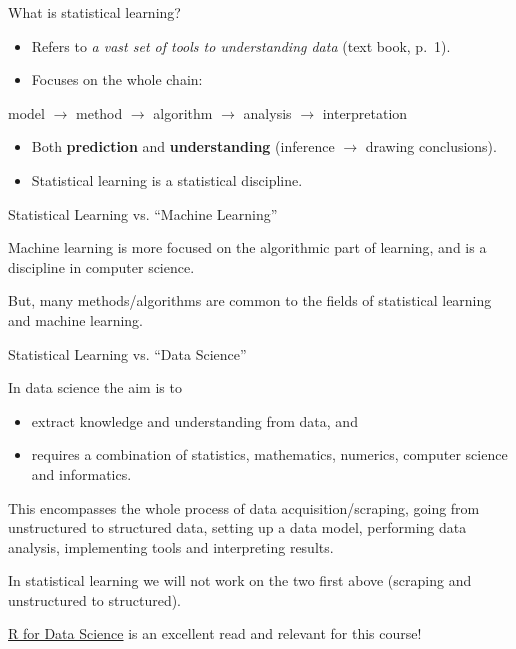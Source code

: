 \documentclass[10pt,ignorenonframetext,]{beamer}
\providecommand{\tightlist}{%
  \setlength{\itemsep}{0pt}\setlength{\parskip}{0pt}}
\begin{document}
\begin{frame}{What is statistical learning?}

\begin{itemize}
\item
  Refers to \emph{a vast set of tools to understanding data} (text book,
  p.~1).
\item
  Focuses on the whole chain:
\end{itemize}

model \(\rightarrow\) method \(\rightarrow\) algorithm \(\rightarrow\)
analysis \(\rightarrow\) interpretation

\begin{itemize}
\item
  Both \textbf{prediction} and \textbf{understanding} (inference
  \(\rightarrow\) drawing conclusions).
\item
  Statistical learning is a statistical discipline.
\end{itemize}

\end{frame}

\begin{frame}{Statistical Learning vs. ``Machine Learning''}

Machine learning is more focused on the algorithmic part of learning,
and is a discipline in computer science.

But, many methods/algorithms are common to the fields of statistical
learning and machine learning.

\end{frame}

\begin{frame}{Statistical Learning vs. ``Data Science''}

In data science the aim is to

\begin{itemize}
\tightlist
\item
  extract knowledge and understanding from data, and
\item
  requires a combination of statistics, mathematics, numerics, computer
  science and informatics.
\end{itemize}

This encompasses the whole process of data acquisition/scraping, going
from unstructured to structured data, setting up a data model,
performing data analysis, implementing tools and interpreting results.

In statistical learning we will not work on the two first above
(scraping and unstructured to structured).

\href{http://r4ds.had.co.nz/}{R for Data Science} is an excellent read
and relevant for this course!

\end{frame}
\end{document}
